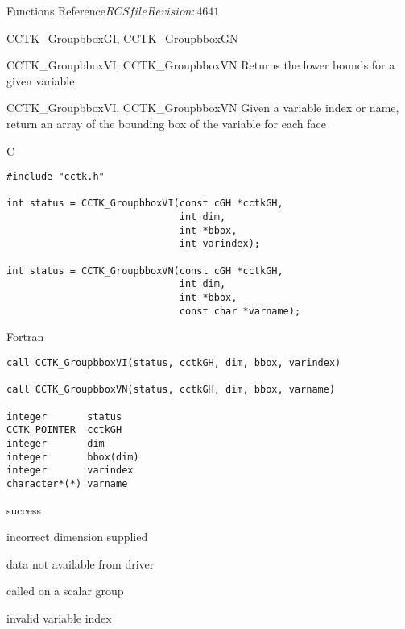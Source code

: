 \begin{cactuspart}{ Functions Reference}{$RCSfile$}{$Revision: 4641 $}
\begin{FunctionDescription}{CCTK\_GroupbboxGI, CCTK\_GroupbboxGN}
\begin{SeeAlsoSection}
\begin{SeeAlso}{CCTK\_GroupbboxVI, CCTK\_GroupbboxVN}
Returns the lower bounds for a given variable.
\end{SeeAlso}
\end{SeeAlsoSection}
\end{FunctionDescription}


\begin{FunctionDescription}{CCTK\_GroupbboxVI, CCTK\_GroupbboxVN}
\label{CCTK-GroupbboxVI}
\label{CCTK-GroupbboxVN}
Given a variable index or name, return an array of the bounding box of the variable for each face

\begin{SynopsisSection}
\begin{Synopsis}{C}
\begin{verbatim}
#include "cctk.h"

int status = CCTK_GroupbboxVI(const cGH *cctkGH,
                              int dim,
                              int *bbox,
                              int varindex);

int status = CCTK_GroupbboxVN(const cGH *cctkGH,
                              int dim,
                              int *bbox,
                              const char *varname);
\end{verbatim}
\end{Synopsis}
\begin{Synopsis}{Fortran}
\begin{verbatim}
call CCTK_GroupbboxVI(status, cctkGH, dim, bbox, varindex)

call CCTK_GroupbboxVN(status, cctkGH, dim, bbox, varname)

integer       status
CCTK_POINTER  cctkGH
integer       dim
integer       bbox(dim)
integer       varindex
character*(*) varname
\end{verbatim}
\end{Synopsis}
\end{SynopsisSection}

\begin{ResultSection}
\begin{Result}{0} success \end{Result}
\begin{Result}{-1} incorrect dimension supplied \end{Result}
\begin{Result}{-2} data not available from driver \end{Result}
\begin{Result}{-3} called on a scalar group \end{Result}
\begin{Result}{-4} invalid variable index \end{Result}
\end{ResultSection}


\end{FunctionDescription}
\end{cactuspart}

